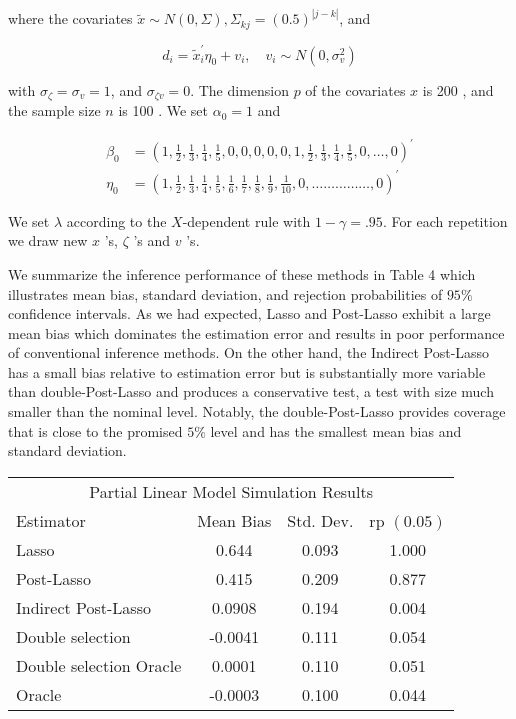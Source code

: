 \documentclass[10pt]{article}
\begin{document}
where the covariates \(\tilde{x} \sim N(0, \Sigma), \Sigma_{k j}=(0.5)^{|j-k|}\), and

\[
d_{i}=\tilde{x}_{i}^{\prime} \eta_{0}+v_{i}, \quad v_{i} \sim N\left(0, \sigma_{v}^{2}\right)
\]

with \(\sigma_{\zeta}=\sigma_{v}=1\), and \(\sigma_{\zeta v}=0\). The dimension \(p\) of the covariates \(x\) is 200 , and the sample size \(n\) is 100 . We set \(\alpha_{0}=1\) and

\[
\begin{aligned}
\beta_{0} & =\left(1, \frac{1}{2}, \frac{1}{3}, \frac{1}{4}, \frac{1}{5}, 0,0,0,0,0,1, \frac{1}{2}, \frac{1}{3}, \frac{1}{4}, \frac{1}{5}, 0, \ldots, 0\right)^{\prime} \\
\eta_{0} & =\left(1, \frac{1}{2}, \frac{1}{3}, \frac{1}{4}, \frac{1}{5}, \frac{1}{6}, \frac{1}{7}, \frac{1}{8}, \frac{1}{9}, \frac{1}{10}, 0, \ldots \ldots \ldots \ldots \ldots, 0\right)^{\prime}
\end{aligned}
\]

We set \(\lambda\) according to the \(X\)-dependent rule with \(1-\gamma=.95\). For each repetition we draw new \(x\) 's, \(\zeta\) 's and \(v\) 's.

We summarize the inference performance of these methods in Table 4 which illustrates mean bias, standard deviation, and rejection probabilities of \(95 \%\) confidence intervals. As we had expected, Lasso and Post-Lasso exhibit a large mean bias which dominates the estimation error and results in poor performance of conventional inference methods. On the other hand, the Indirect Post-Lasso has a small bias relative to estimation error but is substantially more variable than double-Post-Lasso and produces a conservative test, a test with size much smaller than the nominal level. Notably, the double-Post-Lasso provides coverage that is close to the promised \(5 \%\) level and has the smallest mean bias and standard deviation.

\begin{center}
\begin{tabular}{lccc}
\multicolumn{4}{c}{Partial Linear Model Simulation Results} \\
Estimator & Mean Bias & Std. Dev. & rp \((0.05)\) \\
\hline
Lasso & 0.644 & 0.093 & 1.000 \\
Post-Lasso & 0.415 & 0.209 & 0.877 \\
Indirect Post-Lasso & 0.0908 & 0.194 & 0.004 \\
Double selection & -0.0041 & 0.111 & 0.054 \\
Double selection Oracle & 0.0001 & 0.110 & 0.051 \\
Oracle & -0.0003 & 0.100 & 0.044 \\
\hline
\end{tabular}
\end{center}
\end{document}
